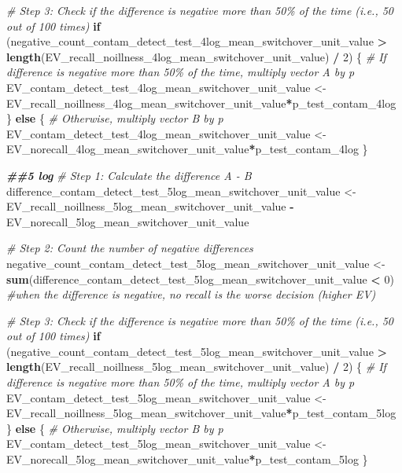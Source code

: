 \documentclass[
]{article}
\newenvironment{Shaded}{\begin{snugshade}}{\end{snugshade}}
\newcommand{\CommentTok}[1]{\textcolor[rgb]{0.56,0.35,0.01}{\textit{#1}}}
\newcommand{\ControlFlowTok}[1]{\textcolor[rgb]{0.13,0.29,0.53}{\textbf{#1}}}
\newcommand{\DecValTok}[1]{\textcolor[rgb]{0.00,0.00,0.81}{#1}}
\newcommand{\DocumentationTok}[1]{\textcolor[rgb]{0.56,0.35,0.01}{\textbf{\textit{#1}}}}
\newcommand{\FunctionTok}[1]{\textcolor[rgb]{0.13,0.29,0.53}{\textbf{#1}}}
\newcommand{\NormalTok}[1]{#1}
\newcommand{\OtherTok}[1]{\textcolor[rgb]{0.56,0.35,0.01}{#1}}
\newcommand{\SpecialCharTok}[1]{\textcolor[rgb]{0.81,0.36,0.00}{\textbf{#1}}}
\begin{document}
\begin{Shaded}
\begin{Highlighting}[]
\CommentTok{\# Step 3: Check if the difference is negative more than 50\% of the time (i.e., 50 out of 100 times)}
\ControlFlowTok{if}\NormalTok{ (negative\_count\_contam\_detect\_test\_4log\_mean\_switchover\_unit\_value }\SpecialCharTok{\textgreater{}} \FunctionTok{length}\NormalTok{(EV\_recall\_noillness\_4log\_mean\_switchover\_unit\_value) }\SpecialCharTok{/} \DecValTok{2}\NormalTok{) \{}
  \CommentTok{\# If difference is negative more than 50\% of the time, multiply vector A by p}
\NormalTok{  EV\_contam\_detect\_test\_4log\_mean\_switchover\_unit\_value }\OtherTok{\textless{}{-}}\NormalTok{ EV\_recall\_noillness\_4log\_mean\_switchover\_unit\_value}\SpecialCharTok{*}\NormalTok{p\_test\_contam\_4log}
\NormalTok{\} }\ControlFlowTok{else}\NormalTok{ \{}
  \CommentTok{\# Otherwise, multiply vector B by p}
\NormalTok{ EV\_contam\_detect\_test\_4log\_mean\_switchover\_unit\_value  }\OtherTok{\textless{}{-}}\NormalTok{ EV\_norecall\_4log\_mean\_switchover\_unit\_value}\SpecialCharTok{*}\NormalTok{p\_test\_contam\_4log}
\NormalTok{\}}



\DocumentationTok{\#\#5 log}
\CommentTok{\# Step 1: Calculate the difference A {-} B}
\NormalTok{difference\_contam\_detect\_test\_5log\_mean\_switchover\_unit\_value }\OtherTok{\textless{}{-}}\NormalTok{ EV\_recall\_noillness\_5log\_mean\_switchover\_unit\_value }\SpecialCharTok{{-}}\NormalTok{ EV\_norecall\_5log\_mean\_switchover\_unit\_value}

\CommentTok{\# Step 2: Count the number of negative differences}
\NormalTok{negative\_count\_contam\_detect\_test\_5log\_mean\_switchover\_unit\_value }\OtherTok{\textless{}{-}} \FunctionTok{sum}\NormalTok{(difference\_contam\_detect\_test\_5log\_mean\_switchover\_unit\_value }\SpecialCharTok{\textless{}} \DecValTok{0}\NormalTok{) }\CommentTok{\#when the difference is negative, no recall is the worse decision (higher EV)}

\CommentTok{\# Step 3: Check if the difference is negative more than 50\% of the time (i.e., 50 out of 100 times)}
\ControlFlowTok{if}\NormalTok{ (negative\_count\_contam\_detect\_test\_5log\_mean\_switchover\_unit\_value }\SpecialCharTok{\textgreater{}} \FunctionTok{length}\NormalTok{(EV\_recall\_noillness\_5log\_mean\_switchover\_unit\_value) }\SpecialCharTok{/} \DecValTok{2}\NormalTok{) \{}
  \CommentTok{\# If difference is negative more than 50\% of the time, multiply vector A by p}
\NormalTok{  EV\_contam\_detect\_test\_5log\_mean\_switchover\_unit\_value }\OtherTok{\textless{}{-}}\NormalTok{ EV\_recall\_noillness\_5log\_mean\_switchover\_unit\_value}\SpecialCharTok{*}\NormalTok{p\_test\_contam\_5log}
\NormalTok{\} }\ControlFlowTok{else}\NormalTok{ \{}
  \CommentTok{\# Otherwise, multiply vector B by p}
\NormalTok{ EV\_contam\_detect\_test\_5log\_mean\_switchover\_unit\_value  }\OtherTok{\textless{}{-}}\NormalTok{ EV\_norecall\_5log\_mean\_switchover\_unit\_value}\SpecialCharTok{*}\NormalTok{p\_test\_contam\_5log}
\NormalTok{\}}



\end{Highlighting}
\end{Shaded}
\end{document}
